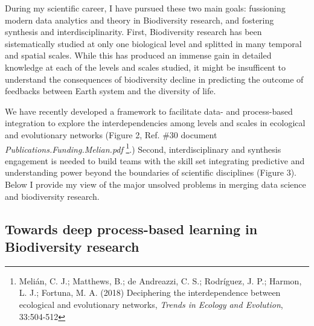\documentclass[authoryear,1p,12pt]{elsarticle}
\begin{document}
During my scientific career, I have pursued these two main goals:
fussioning modern data analytics and theory in Biodiversity research,
and fostering synthesis and interdisciplinarity. First, Biodiversity
research has been sistematically studied at only one biological level
and splitted in many temporal and spatial scales. While this has
produced an immense gain in detailed knowledge at each of the levels
and scales studied, it might be insufficent to understand the
consequences of biodiversity decline in predicting the outcome of
feedbacks between Earth system and the diversity of life.

\pagebreak


We have recently developed a framework to facilitate data- and
process-based integration to explore the interdependencies among
levels and scales in ecological and evolutionary networks (Figure 2,
Ref. \#30 document {\em Publications.Funding.Melian.pdf}
\footnote{Melián, C. J.; Matthews, B.; de Andreazzi, C. S.; Rodríguez,
  J. P.; Harmon, L. J.; Fortuna, M. A. (2018) Deciphering the
  interdependence between ecological and evolutionary networks, {\em
    Trends in Ecology and Evolution}, 33:504-512}.) Second,
interdisciplinary and synthesis engagement is needed to build teams
with the skill set integrating predictive and understanding power
beyond the boundaries of scientific disciplines (Figure 3). Below I
provide my view of the major unsolved problems in merging data science
and biodiversity research.

\subsection{{\bf Towards deep process-based learning in Biodiversity research}}
\end{document}
